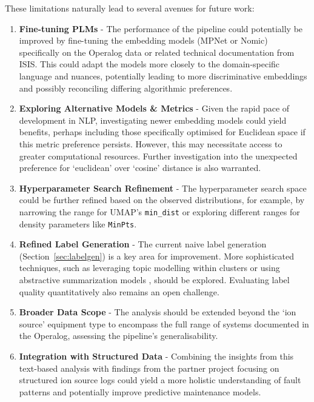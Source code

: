 \documentclass[10pt,oneside]{report}
\begin{document}
These limitations naturally lead to several avenues for future work:
\begin{enumerate}
    \item \textbf{Fine-tuning PLMs} - The performance of the pipeline could potentially be improved by fine-tuning the embedding models (MPNet or Nomic) specifically on the Operalog data or related technical documentation from ISIS. This could adapt the models more closely to the domain-specific language and nuances, potentially leading to more discriminative embeddings and possibly reconciling differing algorithmic preferences.
    \item \textbf{Exploring Alternative Models \& Metrics} - Given the rapid pace of development in NLP, investigating newer embedding models could yield benefits, perhaps including those specifically optimised for Euclidean space if this metric preference persists. However, this may necessitate access to greater computational resources. Further investigation into the unexpected preference for `euclidean' over `cosine' distance is also warranted.
    \item \textbf{Hyperparameter Search Refinement} - The hyperparameter search space could be further refined based on the observed distributions, for example, by narrowing the range for UMAP's \texttt{min\_dist} or exploring different ranges for density parameters like \texttt{MinPts}.
    \item \textbf{Refined Label Generation} - The current naive label generation (Section~\ref{sec:labelgen}) is a key area for improvement. More sophisticated techniques, such as leveraging topic modelling \cite{curiskis2020evaluation} within clusters or using abstractive summarization models \cite{nallapati2016abstractive}, should be explored. Evaluating label quality quantitatively also remains an open challenge.
    \item \textbf{Broader Data Scope} - The analysis should be extended beyond the `ion source' equipment type to encompass the full range of systems documented in the Operalog, assessing the pipeline's generalisability.
    \item \textbf{Integration with Structured Data} - Combining the insights from this text-based analysis with findings from the partner project focusing on structured ion source logs could yield a more holistic understanding of fault patterns and potentially improve predictive maintenance models.
\end{enumerate}
\end{document}
